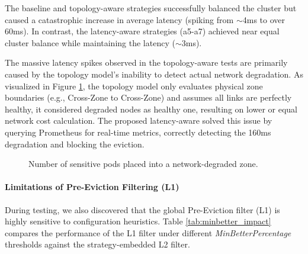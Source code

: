 The baseline and topology-aware strategies successfully balanced the cluster but caused a catastrophic increase in average latency (spiking from $\sim$4ms to over 60ms). In contrast, the latency-aware strategies (a5-a7) achieved near equal cluster balance while maintaining the latency ($\sim$3ms).

The massive latency spikes observed in the topology-aware tests are primarily caused by the topology model's inability to detect actual network degradation. As visualized in Figure \ref{fig:topology_flaw}, the topology model only evaluates physical zone boundaries (e.g., Cross-Zone to Cross-Zone) and assumes all links are perfectly healthy, it considered degraded nodes as healthy one, resulting on lower or equal network cost calculation. The proposed latency-aware solved this issue by querying Prometheus for real-time metrics, correctly detecting the 160ms degradation and blocking the eviction.

\begin{figure}[tbp]
    \centering
    \caption{Number of sensitive pods placed into a network-degraded zone.}
    \label{fig:topology_flaw}
\end{figure}

\paragraph{Limitations of Pre-Eviction Filtering (L1)}
\label{subsubsec:netaware4_resultanalysis1_limitation}

During testing, we also discovered that the global Pre-Eviction filter (L1) is highly sensitive to configuration heuristics. Table \ref{tab:minbetter_impact} compares the performance of the L1 filter under different \textit{MinBetterPercentage} thresholds against the strategy-embedded L2 filter.

